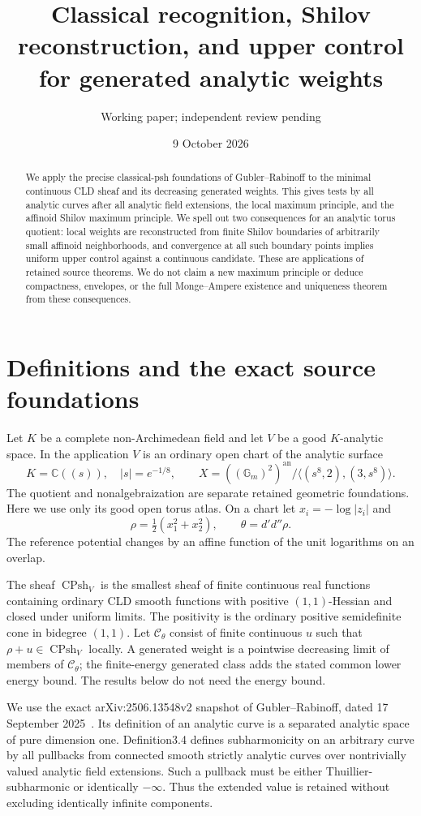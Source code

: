 \documentclass[11pt]{article}
\title{Classical recognition, Shilov reconstruction, and upper control\\for generated analytic weights}
\author{Working paper; independent review pending}
\date{9 October 2026}
\newcommand{\CPsh}{\operatorname{CPsh}}
\newcommand{\DD}{d'd''}
\begin{document}
\maketitle
\begin{abstract}
We apply the precise classical-psh foundations of Gubler--Rabinoff to the
minimal continuous CLD sheaf and its decreasing generated weights. This
gives tests by all analytic curves after all analytic field extensions,
the local maximum principle, and the affinoid Shilov maximum principle.
We spell out two consequences for an analytic torus quotient: local
weights are reconstructed from finite Shilov boundaries of arbitrarily
small affinoid neighborhoods, and convergence at all such boundary
points implies uniform upper control against a continuous candidate.
These are applications of retained source theorems. We do not claim a new
maximum principle or deduce compactness, envelopes, or the full
Monge--Ampere existence and uniqueness theorem from these consequences.
\end{abstract}

\section{Definitions and the exact source foundations}
Let $K$ be a complete non-Archimedean field and let $V$ be a good
$K$-analytic space. In the application $V$ is an ordinary open chart of
the analytic surface
\[
 K=\mathbb C((s)),\quad |s|=e^{-1/8},\qquad
 X=((\mathbb G_m)^2)^{\mathrm{an}}/
       \langle(s^8,2),(3,s^8)\rangle .
\]
The quotient and nonalgebraization are separate retained geometric
foundations. Here we use only its good open torus atlas. On a chart let
$x_i=-\log|z_i|$ and
\[
 \rho=\tfrac12(x_1^2+x_2^2),\qquad \theta=\DD\rho.
\]
The reference potential changes by an affine function of the unit
logarithms on an overlap.

The sheaf $\CPsh_V$ is the smallest sheaf of finite continuous real
functions containing ordinary CLD smooth functions with positive
$(1,1)$-Hessian and closed under uniform limits. The positivity is the
ordinary positive semidefinite cone in bidegree $(1,1)$.
Let $\mathcal C_\theta$ consist of finite continuous $u$ such that
$\rho+u\in\CPsh_V$ locally. A generated weight is a pointwise decreasing
limit of members of $\mathcal C_\theta$; the finite-energy generated class
adds the stated common lower energy bound. The results below do not need
the energy bound.

We use the exact arXiv:2506.13548v2 snapshot of Gubler--Rabinoff, dated
17 September 2025~\cite{GR}. Its definition of an analytic curve is a
separated analytic space of pure dimension one. Definition3.4 defines
subharmonicity on an arbitrary curve by all pullbacks from connected
smooth strictly analytic curves over nontrivially valued analytic field
extensions. Such a pullback must be either Thuillier-subharmonic or
identically $-\infty$. Thus the extended value is retained without
excluding identically infinite components.
\end{document}
